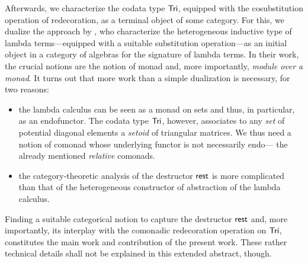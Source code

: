 \documentclass{llncs}
\begin{document}
 Afterwards, we characterize the codata type $\mathsf{Tri}$, equipped with the cosubstitution operation of redecoration, as a terminal object of some category.
 For this, we dualize the approach by \textcite{DBLP:journals/iandc/HirschowitzM10},
 who characterize the heterogeneous inductive type of lambda terms---equipped with a suitable substitution operation---as an initial object in
 a category of algebras for the signature of lambda terms.
 In their work, the crucial notions are the notion of monad and, more importantly, \emph{module over a monad}.
 It turns out that more work than a simple dualization is necessary, for two reasons:
 \begin{itemize}
  \item the lambda calculus can be seen as a monad on sets and thus, in particular, as an endofunctor.
        The codata type $\mathsf{Tri}$, however, associates to any \emph{set} of potential diagonal elements a \emph{setoid}
        of triangular matrices. We thus need a notion of comonad whose underlying functor is not necessarily endo---
        the already mentioned \emph{relative} comonads.
  \item the category-theoretic analysis of the destructor $\mathsf{rest}$ is more complicated than that of the heterogeneous 
           constructor of abstraction of the lambda calculus.
 \end{itemize}
 Finding a suitable categorical notion to capture the destructor $\mathsf{rest}$ and, more importantly, its interplay with
 the comonadic redecoration operation on $\mathsf{Tri}$, constitutes the main work and contribution of the present work.
 These rather technical details shall not be explained in this extended abstract, though.
 
 
\end{document}
